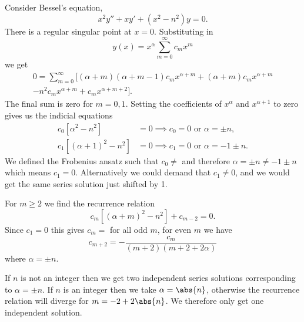 \documentclass[fleqn]{NotesClass}
\begin{document}
    \begin{exm}{}{}
        Consider Bessel's equation,
        \begin{equation}
            x^2y'' + xy' + (x^2 - n^2)y = 0.
        \end{equation}
        There is a regular singular point at \(x = 0\).
        Substituting in
        \begin{equation}
            y(x) = x^\alpha\sum_{m=0}^{\infty} c_mx^m
        \end{equation}
        we get
        \begin{multline}
            0 = \sum_{m=0}^{\infty} [(\alpha + m)(\alpha + m - 1)c_mx^{\alpha + m} + (\alpha + m)c_mx^{\alpha + m}\\
            - n^2 c_mx^{\alpha + m} + c_mx^{\alpha + m + 2}].
        \end{multline}
        The final sum is zero for \(m = 0, 1\).
        Setting the coefficients of \(x^\alpha\) and \(x^{\alpha + 1}\) to zero gives us the indicial equations
        \begin{align}
            c_0[\alpha^2 - n^2] &= 0 \implies c_0 = 0 \text{ or } \alpha = \pm n,\\
            c_1[(\alpha + 1)^2 - n^2] &= 0 \implies c_1 = 0 \text{ or } \alpha = -1 \pm n.
        \end{align}
        We defined the Frobenius ansatz such that \(c_0 \ne \) and therefore \(\alpha = \pm n \ne -1 \pm n\) which means \(c_1 = 0\).
        Alternatively we could demand that \(c_1 \ne 0\), and we would get the same series solution just shifted by 1.
        
        For \(m \ge 2\) we find the recurrence relation
        \begin{equation}
            c_m[(\alpha + m)^2 - n^2] + c_{m-2} = 0.
        \end{equation}
        Since \(c_1 = 0\)  this gives \(c_m = \) for all odd \(m\), for even \(m\) we have
        \begin{equation}
            c_{m+2} = -\frac{c_m}{(m + 2)(m + 2 + 2\alpha)}
        \end{equation}
        where \(\alpha = \pm n\).
        
        If \(n\) is not an integer then we get two independent series solutions corresponding to \(\alpha = \pm n\).
        If \(n\) is an integer then we take \(\alpha = \abs{n}\), otherwise the recurrence relation will diverge for \(m = -2 + 2\abs{n}\).
        We therefore only get one independent solution.
        

\end{exm}
\end{document}
